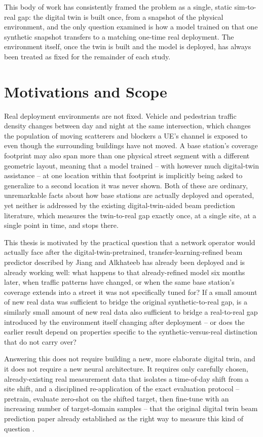 \documentclass{iutbscthesis}
\begin{document}
This body of work has consistently framed the problem as a single, static sim-to-real gap: the digital twin is built once, from a snapshot of the physical environment, and the only question examined is how a model trained on that one synthetic snapshot transfers to a matching one-time real deployment. The environment itself, once the twin is built and the model is deployed, has always been treated as fixed for the remainder of each study.

\section{Motivations and Scope}

Real deployment environments are not fixed. Vehicle and pedestrian traffic density changes between day and night at the same intersection, which changes the population of moving scatterers and blockers a UE's channel is exposed to even though the surrounding buildings have not moved. A base station's coverage footprint may also span more than one physical street segment with a different geometric layout, meaning that a model trained -- with however much digital-twin assistance -- at one location within that footprint is implicitly being asked to generalize to a second location it was never shown. Both of these are ordinary, unremarkable facts about how base stations are actually deployed and operated, yet neither is addressed by the existing digital-twin-aided beam prediction literature, which measures the twin-to-real gap exactly once, at a single site, at a single point in time, and stops there.

This thesis is motivated by the practical question that a network operator would actually face after the digital-twin-pretrained, transfer-learning-refined beam predictor described by Jiang and Alkhateeb has already been deployed and is already working well: what happens to that already-refined model six months later, when traffic patterns have changed, or when the same base station's coverage extends into a street it was not specifically tuned for? If a small amount of new real data was sufficient to bridge the original synthetic-to-real gap, is a similarly small amount of new real data also sufficient to bridge a real-to-real gap introduced by the environment itself changing after deployment -- or does the earlier result depend on properties specific to the synthetic-versus-real distinction that do not carry over?

Answering this does not require building a new, more elaborate digital twin, and it does not require a new neural architecture. It requires only carefully chosen, already-existing real measurement data that isolates a time-of-day shift from a site shift, and a disciplined re-application of the exact evaluation protocol -- pretrain, evaluate zero-shot on the shifted target, then fine-tune with an increasing number of target-domain samples -- that the original digital twin beam prediction paper already established as the right way to measure this kind of question \cite{jiang2023digitaltwinbeam}.
\end{document}
